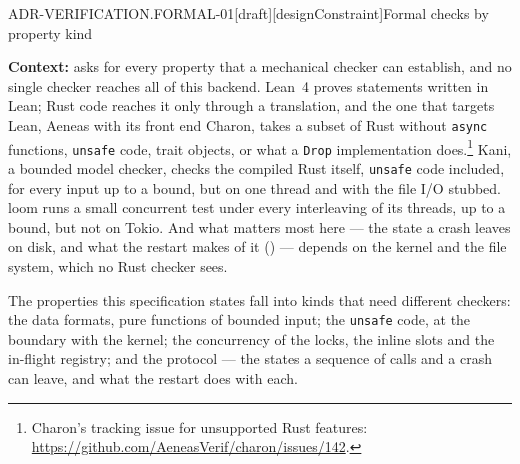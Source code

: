 \begin{requirement}{ADR-VERIFICATION.FORMAL-01}[draft][designConstraint]{Formal checks by property kind}


  \textbf{Context:}  asks for every
  property that a mechanical checker can establish, and no single checker
  reaches all of this backend. Lean~4 proves statements
  written in Lean; Rust code reaches it only through a translation, and the
  one that targets Lean, Aeneas with its front end Charon, takes a subset of
  Rust without \texttt{async} functions, \texttt{unsafe} code, trait objects,
  or what a \texttt{Drop} implementation does.\footnote{Charon's tracking
  issue for unsupported Rust features:
  \url{https://github.com/AeneasVerif/charon/issues/142}.} Kani, a bounded
  model checker, checks the compiled Rust itself, \texttt{unsafe} code
  included, for every input up to a bound, but on one thread and with the
  file I/O stubbed. loom runs a small concurrent test under every
  interleaving of its threads, up to a bound, but not on Tokio. And what
  matters most here --- the state a crash leaves on disk, and what the
  restart makes of it () --- depends on
  the kernel and the file system, which no Rust checker sees.

  The properties this specification states fall into kinds that need
  different checkers: the data formats, pure functions of bounded input; the
  \texttt{unsafe} code, at the boundary with the kernel; the concurrency of
  the locks, the inline slots and the in-flight registry; and the protocol
  --- the states a sequence of calls and a crash can leave, and what the
  restart does with each.


\end{requirement}
